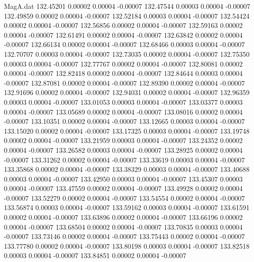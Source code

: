 \begin{filecontents}{MagA.dat}
 132.45201    0.00002    0.00004   -0.00007
 132.47544    0.00003    0.00004   -0.00007
 132.49859    0.00002    0.00004   -0.00007
 132.52184    0.00003    0.00004   -0.00007
 132.54424    0.00002    0.00004   -0.00007
 132.56856    0.00002    0.00004   -0.00007
 132.59163    0.00002    0.00004   -0.00007
 132.61491    0.00002    0.00004   -0.00007
 132.63842    0.00002    0.00004   -0.00007
 132.66134    0.00002    0.00004   -0.00007
 132.68466    0.00003    0.00004   -0.00007
 132.70707    0.00003    0.00004   -0.00007
 132.73035    0.00002    0.00004   -0.00007
 132.75350    0.00003    0.00004   -0.00007
 132.77767    0.00002    0.00004   -0.00007
 132.80081    0.00002    0.00004   -0.00007
 132.82418    0.00002    0.00004   -0.00007
 132.84644    0.00003    0.00004   -0.00007
 132.87081    0.00002    0.00004   -0.00007
 132.89390    0.00002    0.00004   -0.00007
 132.91696    0.00002    0.00004   -0.00007
 132.94031    0.00002    0.00004   -0.00007
 132.96359    0.00003    0.00004   -0.00007
 133.01053    0.00003    0.00004   -0.00007
 133.03377    0.00003    0.00004   -0.00007
 133.05689    0.00002    0.00004   -0.00007
 133.08016    0.00002    0.00004   -0.00007
 133.10351    0.00002    0.00004   -0.00007
 133.12665    0.00003    0.00004   -0.00007
 133.15020    0.00002    0.00004   -0.00007
 133.17325    0.00003    0.00004   -0.00007
 133.19748    0.00002    0.00004   -0.00007
 133.21959    0.00003    0.00004   -0.00007
 133.24352    0.00002    0.00004   -0.00007
 133.26582    0.00003    0.00004   -0.00007
 133.28925    0.00002    0.00004   -0.00007
 133.31262    0.00002    0.00004   -0.00007
 133.33619    0.00003    0.00004   -0.00007
 133.35868    0.00002    0.00004   -0.00007
 133.38329    0.00003    0.00004   -0.00007
 133.40688    0.00003    0.00004   -0.00007
 133.42950    0.00003    0.00004   -0.00007
 133.45307    0.00003    0.00004   -0.00007
 133.47559    0.00002    0.00004   -0.00007
 133.49928    0.00002    0.00004   -0.00007
 133.52279    0.00002    0.00004   -0.00007
 133.54554    0.00002    0.00004   -0.00007
 133.56874    0.00003    0.00004   -0.00007
 133.59162    0.00003    0.00004   -0.00007
 133.61591    0.00002    0.00004   -0.00007
 133.63896    0.00002    0.00004   -0.00007
 133.66196    0.00002    0.00004   -0.00007
 133.68504    0.00002    0.00004   -0.00007
 133.70835    0.00003    0.00004   -0.00007
 133.73146    0.00002    0.00004   -0.00007
 133.75443    0.00002    0.00004   -0.00007
 133.77780    0.00002    0.00004   -0.00007
 133.80198    0.00003    0.00004   -0.00007
 133.82518    0.00003    0.00004   -0.00007
 133.84851    0.00002    0.00004   -0.00007

\end{filecontents}
